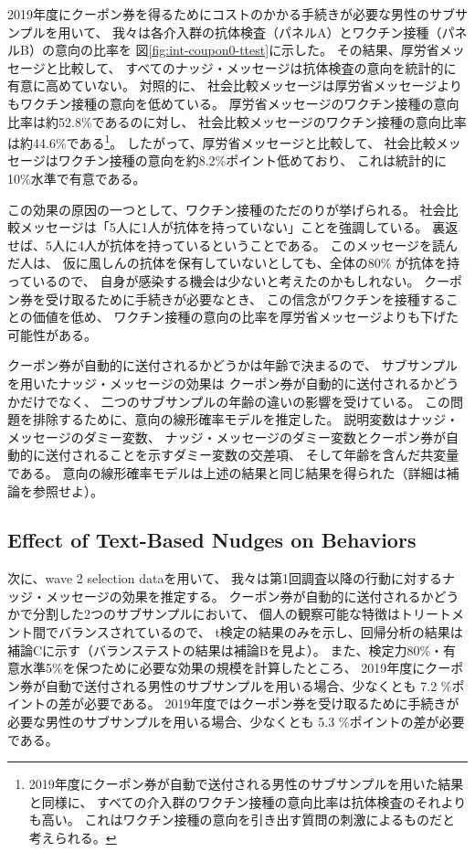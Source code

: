 \documentclass[
  11pt,
  a4paper,
]{article}
\begin{document}
2019年度にクーポン券を得るためにコストのかかる手続きが必要な男性のサブサンプルを用いて、
我々は各介入群の抗体検査（パネルA）とワクチン接種（パネルB）の意向の比率を
図\ref{fig:int-coupon0-ttest}に示した。
その結果、厚労省メッセージと比較して、
すべてのナッジ・メッセージは抗体検査の意向を統計的に有意に高めていない。
対照的に、
社会比較メッセージは厚労省メッセージよりもワクチン接種の意向を低めている。
厚労省メッセージのワクチン接種の意向比率は約52.8\%であるのに対し、
社会比較メッセージのワクチン接種の意向比率は約44.6\%である\footnote{2019年度にクーポン券が自動で送付される男性のサブサンプルを用いた結果と同様に、
  すべての介入群のワクチン接種の意向比率は抗体検査のそれよりも高い。
  これはワクチン接種の意向を引き出す質問の刺激によるものだと考えられる。}。
したがって、厚労省メッセージと比較して、
社会比較メッセージはワクチン接種の意向を約8.2\%ポイント低めており、
これは統計的に10\%水準で有意である。

この効果の原因の一つとして、ワクチン接種のただのりが挙げられる。
社会比較メッセージは「5人に1人が抗体を持っていない」ことを強調している。
裏返せば、5人に4人が抗体を持っているということである。
このメッセージを読んだ人は、
仮に風しんの抗体を保有していないとしても、全体の80\% が抗体を持っているので、
自身が感染する機会は少ないと考えたのかもしれない。
クーポン券を受け取るために手続きが必要なとき、
この信念がワクチンを接種することの価値を低め、
ワクチン接種の意向の比率を厚労省メッセージよりも下げた可能性がある。

クーポン券が自動的に送付されるかどうかは年齢で決まるので、
サブサンプルを用いたナッジ・メッセージの効果は
クーポン券が自動的に送付されるかどうかだけでなく、
二つのサブサンプルの年齢の違いの影響を受けている。
この問題を排除するために、意向の線形確率モデルを推定した。
説明変数はナッジ・メッセージのダミー変数、
ナッジ・メッセージのダミー変数とクーポン券が自動的に送付されることを示すダミー変数の交差項、
そして年齢を含んだ共変量である。
意向の線形確率モデルは上述の結果と同じ結果を得られた（詳細は補論を参照せよ）。

\hypertarget{behavior}{%
\subsection{Effect of Text-Based Nudges on Behaviors}\label{behavior}}

次に、wave 2 selection dataを用いて、
我々は第1回調査以降の行動に対するナッジ・メッセージの効果を推定する。
クーポン券が自動的に送付されるかどうかで分割した2つのサブサンプルにおいて、
個人の観察可能な特徴はトリートメント間でバランスされているので、
t検定の結果のみを示し、回帰分析の結果は補論Cに示す（バランステストの結果は補論Bを見よ）。
また、検定力80\%・有意水準5\%を保つために必要な効果の規模を計算したところ、
2019年度にクーポン券が自動で送付される男性のサブサンプルを用いる場合、少なくとも
7.2
\%ポイントの差が必要である。
2019年度ではクーポン券を受け取るために手続きが必要な男性のサブサンプルを用いる場合、少なくとも
5.3
\%ポイントの差が必要である。
\end{document}
